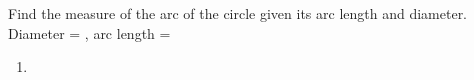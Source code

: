 Find the measure of the arc of the circle given its arc length and diameter.
\newline
Diameter = , arc length = 
\newline
\begin{enumerate}
    \item
\end{enumerate}
